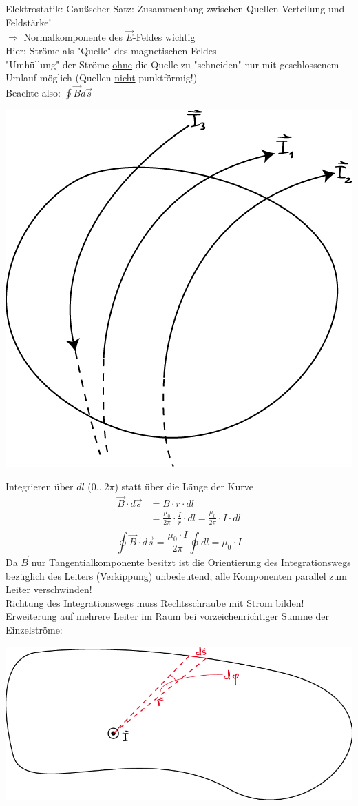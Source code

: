 Elektrostatik: Gaußscher Satz: Zusammenhang zwischen Quellen-Verteilung und Feldstärke! \\
\indent $ \Rightarrow $ Normalkomponente des $ \vec{E} $-Feldes wichtig\\
Hier: Ströme als "Quelle" des magnetischen Feldes \\
"Umhüllung" der Ströme \underline{ohne} die Quelle zu "schneiden" nur mit geschlossenem Umlauf möglich (Quellen \underline{nicht} punktförmig!)\\
Beachte also: $ \displaystyle \oint\vec{B}d\vec{s} $
\begin{center}
	\includegraphics[width=0.4\linewidth]{skizzen/16/16_2B08}
\end{center}
Integrieren über $ dl $ ($ 0...2\pi $) statt über die Länge der Kurve \\
\begin{align*}
\vec{B} \cdot d\vec{s} &= B \cdot r \cdot dl\\
&= \frac{\mu_0}{2\pi} \cdot \frac{I}{r} \cdot dl = \frac{\mu_0}{2\pi} \cdot I \cdot dl \\
\end{align*}
$$ \boxed{{\displaystyle \oint \vec{B}\cdot d\vec{s} = \frac{\mu_0 \cdot I}{2\pi} \oint dl = \mu_0 \cdot I}} $$
Da $ \vec{B} $ nur Tangentialkomponente besitzt ist die Orientierung des Integrationswegs bezüglich des Leiters (Verkippung) unbedeutend; alle Komponenten parallel zum Leiter verschwinden!\\
Richtung des Integrationswegs muss Rechtsschraube mit Strom bilden!\\
Erweiterung auf mehrere Leiter im Raum bei vorzeichenrichtiger Summe der Einzelströme:
\begin{center}
	\includegraphics[width=0.4\linewidth]{skizzen/16/16_2B07}
\end{center}
